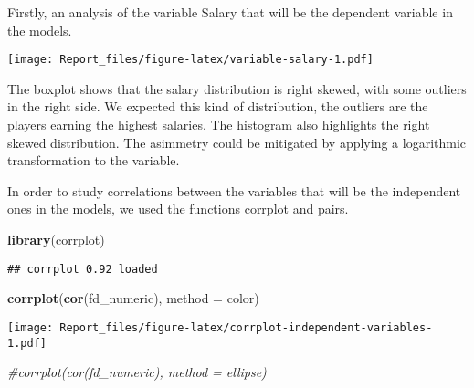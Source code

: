 \documentclass[
]{article}
\newenvironment{Shaded}{\begin{snugshade}}{\end{snugshade}}
\newcommand{\AttributeTok}[1]{\textcolor[rgb]{0.13,0.29,0.53}{#1}}
\newcommand{\CommentTok}[1]{\textcolor[rgb]{0.56,0.35,0.01}{\textit{#1}}}
\newcommand{\FunctionTok}[1]{\textcolor[rgb]{0.13,0.29,0.53}{\textbf{#1}}}
\newcommand{\NormalTok}[1]{#1}
\newcommand{\StringTok}[1]{\textcolor[rgb]{0.31,0.60,0.02}{#1}}
\begin{document}
Firstly, an analysis of the variable Salary that will be the dependent
variable in the models.

\texttt{[image: Report\_files/figure-latex/variable-salary-1.pdf]}

The boxplot shows that the salary distribution is right skewed, with
some outliers in the right side. We expected this kind of distribution,
the outliers are the players earning the highest salaries. The histogram
also highlights the right skewed distribution. The asimmetry could be
mitigated by applying a logarithmic transformation to the variable.

In order to study correlations between the variables that will be the
independent ones in the models, we used the functions corrplot and
pairs.

\begin{Shaded}
\begin{Highlighting}[]
\FunctionTok{library}\NormalTok{(corrplot)}
\end{Highlighting}
\end{Shaded}

\begin{verbatim}
## corrplot 0.92 loaded
\end{verbatim}

\begin{Shaded}
\begin{Highlighting}[]
\FunctionTok{corrplot}\NormalTok{(}\FunctionTok{cor}\NormalTok{(fd\_numeric), }\AttributeTok{method =} \StringTok{\textquotesingle{}color\textquotesingle{}}\NormalTok{)}
\end{Highlighting}
\end{Shaded}

\texttt{[image: Report\_files/figure-latex/corrplot-independent-variables-1.pdf]}

\begin{Shaded}
\begin{Highlighting}[]
\CommentTok{\#corrplot(cor(fd\_numeric), method = \textquotesingle{}ellipse\textquotesingle{})}
\end{Highlighting}
\end{Shaded}
\end{document}

